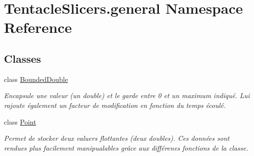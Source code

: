 \hypertarget{namespace_tentacle_slicers_1_1general}{}\section{Tentacle\+Slicers.\+general Namespace Reference}
\label{namespace_tentacle_slicers_1_1general}
\subsection*{Classes}
\begin{DoxyCompactItemize}
\item 
class \hyperlink{class_tentacle_slicers_1_1general_1_1_bounded_double}{Bounded\+Double}
\begin{DoxyCompactList}\small\item\em Encapsule une valeur (un double) et le garde entre 0 et un maximum indiqué. Lui rajoute également un facteur de modification en fonction du temps écoulé. \end{DoxyCompactList}\item 
class \hyperlink{class_tentacle_slicers_1_1general_1_1_point}{Point}
\begin{DoxyCompactList}\small\item\em Permet de stocker deux valuers flottantes (deux doubles). Ces données sont rendues plus facilement manipualables grâce aux différenes fonctions de la classe. \end{DoxyCompactList}\end{DoxyCompactItemize}
